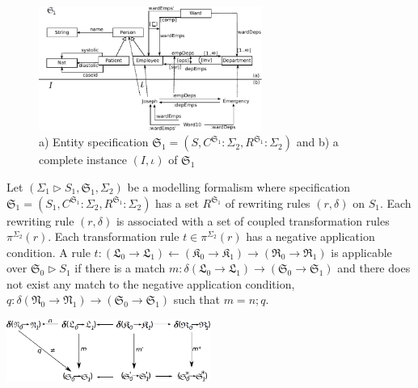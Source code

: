 \documentclass{eceasst}
\begin{document}
\begin{figure}[h]
\centering
 \includegraphics[width=0.65\textwidth]{entity-1-full.pdf}
 \caption{ a) Entity specification $\mathfrak{S}_1 = (S, C^{\mathfrak{S}_1} : \Sigma_2,  R^{\mathfrak{S}_1} : \Sigma_2)$ and  b) a complete instance $(I, \iota)$ of $\mathfrak{S}_1$}
 \label{fig:entity-1-full}
 \end{figure}





\begin{definition}
 Let $(\Sigma_1 \rhd S_1, \mathfrak{S}_1, \Sigma_2)$ be a modelling formalism where specification $\mathfrak{S}_1 = (S_1, C^{\mathfrak{S}_1}:\Sigma_2, R^{\mathfrak{S}_1}:\Sigma_2)$ 
 has a set $R^{\mathfrak{S}_1}$ of rewriting rules $(r, \delta)$ on $S_1$.
 Each rewriting rule $(r, \delta)$ is associated with a set of coupled transformation rules $\pi^{\Sigma_2}(r)$. 
Each transformation rule $t \in \pi^{\Sigma_2}(r)$ has a negative application condition. 
A rule $t: (\mathfrak{L}_0 \rightarrow \mathfrak{L}_1) \leftarrow (\mathfrak{K}_0 \rightarrow \mathfrak{K}_1) \rightarrow  (\mathfrak{R}_0 \rightarrow \mathfrak{R}_1)$ 
is applicable over $\mathfrak{S}_0 \rhd S_1$ 
if there is a match $m : \delta( \mathfrak{L}_0 \rightarrow \mathfrak{L}_1) \rightarrow (\mathfrak{S}_0 \rightarrow \mathfrak{S}_1)$ 
and there does not exist any match to the negative application condition, $q : \delta( \mathfrak{N}_0 \rightarrow \mathfrak{N}_1) \rightarrow (\mathfrak{S}_0 \rightarrow \mathfrak{S}_1)$ 
such that $m = n ; q$. 

\begin{center}
\includegraphics[width=0.5\textwidth]{dpo.pdf}
\end{center}
\end{definition}
\end{document}
